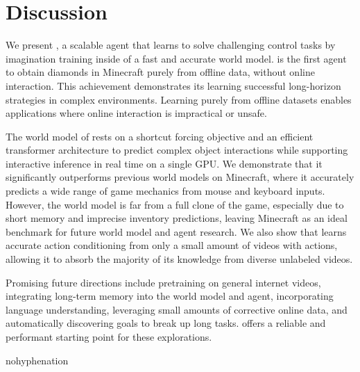 \documentclass[11pt]{article}
\begin{document}
\section{Discussion}

We present \method, a scalable agent that learns to solve challenging control tasks by imagination training inside of a fast and accurate world model.
\method is the first agent to obtain diamonds in Minecraft purely from offline data, without online interaction.
This achievement demonstrates its learning successful long-horizon strategies in complex environments.
Learning purely from offline datasets enables applications where online interaction is impractical or unsafe.

The world model of \method rests on a shortcut forcing objective and an efficient transformer architecture to predict complex object interactions while supporting interactive inference in real time on a single GPU.
We demonstrate that it significantly outperforms previous world models on Minecraft, where it accurately predicts a wide range of game mechanics from mouse and keyboard inputs.
However, the world model is far from a full clone of the game, especially due to short memory and imprecise inventory predictions, leaving Minecraft as an ideal benchmark for future world model and agent research.
We also show that \method learns accurate action conditioning from only a small amount of videos with actions, allowing it to absorb the majority of its knowledge from diverse unlabeled videos.

Promising future directions include pretraining on general internet videos, integrating long-term memory into the world model and agent, incorporating language understanding, leveraging small amounts of corrective online data, and automatically discovering goals to break up long tasks.
\method offers a reliable and performant starting point for these explorations.

\clearpage
\begin{hyphenrules}{nohyphenation}
\setlength{\bibsep}{.5ex plus .5ex}

\end{hyphenrules}

\clearpage
\appendix

\end{document}
